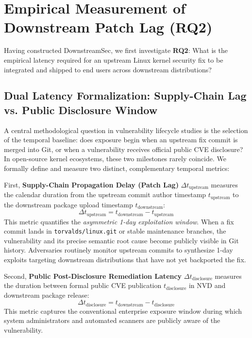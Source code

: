 \documentclass[final,5p,times,twocolumn]{elsarticle}
\begin{document}
\section{Empirical Measurement of Downstream Patch Lag (RQ2)}
\label{sec:latency}

Having constructed DownstreamSec, we first investigate \textbf{RQ2}: What is the empirical latency required for an upstream Linux kernel security fix to be integrated and shipped to end users across downstream distributions?

\subsection{Dual Latency Formalization: Supply-Chain Lag vs. Public Disclosure Window}
A central methodological question in vulnerability lifecycle studies is the selection of the temporal baseline: does exposure begin when an upstream fix commit is merged into Git, or when a vulnerability receives official public CVE disclosure? In open-source kernel ecosystems, these two milestones rarely coincide. We formally define and measure two distinct, complementary temporal metrics:

First, \textbf{Supply-Chain Propagation Delay (Patch Lag)} $\Delta t_{\text{upstream}}$ measures the calendar duration from the upstream commit author timestamp $t_{\text{upstream}}$ to the downstream package upload timestamp $t_{\text{downstream}}$:
\begin{equation}
\Delta t_{\text{upstream}} = t_{\text{downstream}} - t_{\text{upstream}}
\end{equation}
This metric quantifies the \textit{asymmetric 1-day exploitation window}. When a fix commit lands in \texttt{torvalds/linux.git} or stable maintenance branches, the vulnerability and its precise semantic root cause become publicly visible in Git history. Adversaries routinely monitor upstream commits to synthesize 1-day exploits targeting downstream distributions that have not yet backported the fix.

Second, \textbf{Public Post-Disclosure Remediation Latency} $\Delta t_{\text{disclosure}}$ measures the duration between formal public CVE publication $t_{\text{disclosure}}$ in NVD and downstream package release:
\begin{equation}
\Delta t_{\text{disclosure}} = t_{\text{downstream}} - t_{\text{disclosure}}
\end{equation}
This metric captures the conventional enterprise exposure window during which system administrators and automated scanners are publicly aware of the vulnerability.
\end{document}
